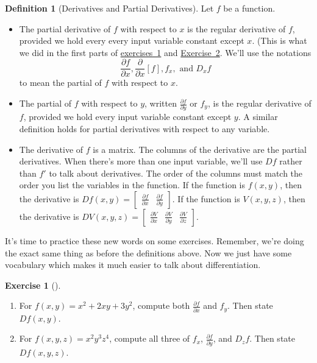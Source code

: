 \documentclass[10pt,]{book}
\theoremstyle{plain}
\theoremstyle{definition}
\newtheorem{definition}[theorem]{Definition}
\theoremstyle{definition}
\theoremstyle{definition}
\theoremstyle{definition}
\newtheorem{exploration}[project]{Exercise}
\theoremstyle{definition}
\numberwithin{equation}{section}
\newcommand{\ds}{\displaystyle}
\newcommand{\amp}{&}
\begin{document}
\begin{definition}[{Derivatives and Partial Derivatives}]\label{definition-23}
Let \(f\) be a function. \leavevmode%
\begin{itemize}[label=\textbullet]
\item{}The partial derivative of \(f\) with respect to \(x\) is the regular derivative of \(f\), provided we hold every every input variable constant except \(x\). (This is what we did in the first parts of \hyperref[prob_differential_volume_of_a_cylinder]{exercises~1} and \hyperref[prob_volumebox]{Exercise~2}.  We'll use the notations%
\begin{equation*}
\frac{\partial f}{\partial x}, 
\frac{\partial}{\partial x}[f],
f_x,
\text{ and } D_x f
\end{equation*}
to mean the partial of \(f\) with respect to \(x\).%
\item{}The partial of \(f\) with respect to \(y\), written \(\ds \frac{\partial f}{\partial y}\) or \(f_y\), is the regular derivative of \(f\), provided we hold every input variable constant except \(y\). A similar definition holds for partial derivatives with respect to any variable.%
\item{}The derivative of \(f\) is a matrix. The columns of the derivative are the partial derivatives. When there's more than one input variable, we'll use \(Df\) rather than \(f'\) to talk about derivatives.  The order of the columns must match the order you list the variables in the function. If the function is \(f(x,y)\), then the derivative is \(Df(x,y) = \begin{bmatrix}\frac{\partial f}{\partial x}\amp \frac{\partial f}{\partial y}
\end{bmatrix} .\) If the function is \(V(x,y,z)\), then the derivative is \(DV(x,y,z) = \begin{bmatrix}\frac{\partial V}{\partial x}\amp \frac{\partial V}{\partial y}\amp \frac{\partial V}{\partial z}
\end{bmatrix} .\)%
\end{itemize}
%
\end{definition}
It's time to practice these new words on some exercises. Remember, we're doing the exact same thing as before the definitions above. Now we just have some vocabulary which makes it much easier to talk about differentiation.%
\begin{exploration}[]\label{exploration-136}
\leavevmode%
\begin{enumerate}[font=\bfseries,label=(\alph*),ref=\alph*]
\item\label{task-285} For \(f(x,y)=x^2+2xy+3y^2\), compute both \(\ds\frac{\partial f}{\partial x}\) and \(f_y\). Then state \(Df(x,y)\).%
\item\label{task-286} For \(f(x,y,z)=x^2y^3z^4\), compute all three of \(f_x\), \(\ds\frac{\partial f}{\partial y}\), and \(D_z f\). Then state \(Df(x,y,z)\).%
\end{enumerate}
\end{exploration}
\end{document}
